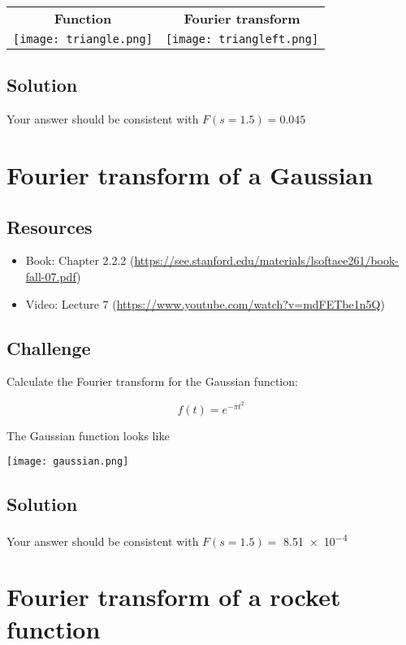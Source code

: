\begin{tabular}{cc}
    \textbf{Function} & \textbf{Fourier transform} \\
    \texttt{[image: triangle.png]} & \texttt{[image: triangleft.png]}
\end{tabular}

\subsection*{Solution}
Your answer should be consistent with $F(s=1.5) = 0.045$




\newpage
\section{Fourier transform of a Gaussian}

\subsection*{Resources}
\begin{itemize}
    \item Book: Chapter 2.2.2 (\url{https://see.stanford.edu/materials/lsoftaee261/book-fall-07.pdf})
    \item Video: Lecture 7 (\url{https://www.youtube.com/watch?v=mdFETbe1n5Q})
\end{itemize}

\subsection*{Challenge}
Calculate the Fourier transform for the Gaussian function:

\begin{equation}
    f(t) = e^{-\pi t^2}
\end{equation}

The Gaussian function looks like

\texttt{[image: gaussian.png]}

\subsection*{Solution}
Your answer should be consistent with $F(s=1.5) =$ \num{8.51e-4}




\newpage
\section{Fourier transform of a rocket function}


